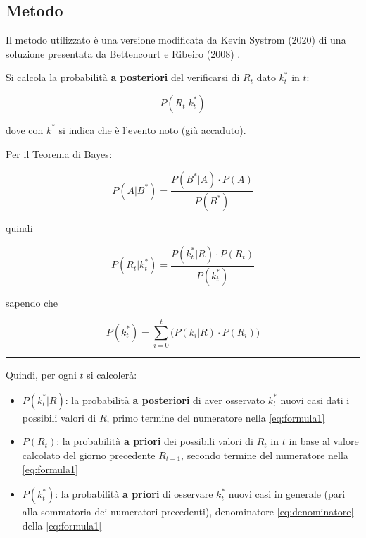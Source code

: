\documentclass[11pt]{article}
\begin{document}
    \hypertarget{metodo}{%
\subsection{Metodo}\label{metodo}}

    Il metodo utilizzato è una versione modificata da Kevin Systrom (2020)
\cite{k-sys} di una soluzione presentata da Bettencourt e Ribeiro (2008)
\cite{bettencourt_ribeiro_2008}.

Si calcola la probabilità \textbf{a posteriori} del verificarsi di
\(R_t\) dato \(k_t^*\) in \(t\):

\[ P(R_t|k_t^*) \]

dove con \(k^*\) si indica che è l'evento noto (già accaduto).

Per il Teorema di Bayes:

\begin{equation}\label{eq:bayestheorem}
P(A|B^*) = \frac{P(B^*|A) \cdot P(A)}{P(B^*)}
\end{equation}

quindi

\begin{equation}\label{eq:formula1}
P(R_t|k_t^*) = \frac{P(k_t^*|R) \cdot P(R_t)}{P(k_t^*)}
\end{equation}

sapendo che

\begin{equation}\label{eq:denominatore}
P(k_t^*) = \sum_{i=0}^{t} \bigg( P(k_i|R) \cdot P(R_i) \bigg)
\end{equation}

\begin{center}\rule{0.5\linewidth}{0.5pt}\end{center}

Quindi, per ogni \(t\) si calcolerà:

\begin{itemize}
\item
  \(P(k_t^*|R)\): la probabilità \textbf{a posteriori} di aver osservato
  \(k_t^*\) nuovi casi dati i possibili valori di \(R\), primo termine
  del numeratore nella \eqref{eq:formula1}
\item
  \(P(R_t)\): la probabilità \textbf{a priori} dei possibili valori di
  \(R_t\) in \(t\) in base al valore calcolato del giorno precedente
  \(R_{t-1}\), secondo termine del numeratore nella \eqref{eq:formula1}
\item
  \(P(k_t^*)\): la probabilità \textbf{a priori} di osservare \(k_t^*\)
  nuovi casi in generale (pari alla sommatoria dei numeratori
  precedenti), denominatore \eqref{eq:denominatore} della
  \eqref{eq:formula1}
\end{itemize}
\end{document}
